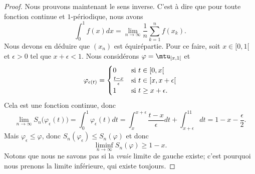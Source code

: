 \begin{proof}
    Nous prouvons maintenant le sens inverse. C'est à dire que pour toute fonction continue et \( 1\)-périodique, nous avons
    \begin{equation}
        \int_0^1f(x)dx=\lim_{n\to \infty} \frac{1}{ n }\sum_{k=1}^nf(x_k).
    \end{equation}
    Nous devons en déduire que \( (x_n)\) est équirépartie. Pour ce faire, soit \( x\in \mathopen[ 0 , 1 [\) et \( \epsilon>0\) tel que \( x+\epsilon<1\). Nous considérons \( \varphi=\mtu_{\mathopen[ x , 1 [}\) et
    \begin{equation}
        \varphi_{\epsilon(t)}=\begin{cases}
            0    &   \text{si \( t\in\mathopen[ 0 , x [\)}\\
            \frac{ t-x }{ \epsilon }    &   \text{si \( t\in \mathopen[ x , x+\epsilon [\)}\\
            1    &    \text{si \( t\geq x+\epsilon\)}.
        \end{cases}
    \end{equation}
    Cela est une fonction continue, donc
    \begin{equation}
        \lim_{n\to \infty} S_n\big( \varphi_{\epsilon}(t) \big)=\int_0^1\varphi_{\epsilon}(t)dt=\int_{x}^{x+\epsilon}\frac{ t-x }{ \epsilon }dt+\int_{x+\epsilon}^11dt=1-x-\frac{ \epsilon }{2}.
    \end{equation}
    Mais \( \varphi_{\epsilon}\leq \varphi\), donc \( S_n(\varphi_{\epsilon})\leq S_n(\varphi)\) et donc
    \begin{equation}
        \liminf_{n\to \infty}S_n(\varphi)\geq 1-x.
    \end{equation}
    Notons que nous ne savons pas si la \emph{vraie} limite de gauche existe; c'est pourquoi nous prenons la limite inférieure, qui existe toujours.


\end{proof}
